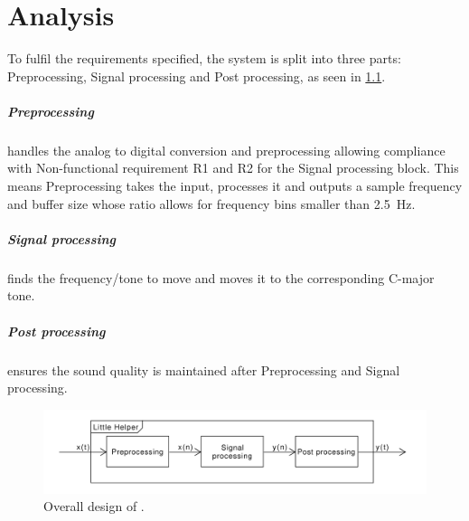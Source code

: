 
\chapter{Analysis}

To fulfil the requirements specified, the system is split into three parts: Preprocessing, Signal processing and Post processing, as seen in \cref{fig:overalldesign}.

\paragraph{Preprocessing} handles the analog to digital conversion and preprocessing allowing compliance with Non-functional requirement R1 and R2 for the Signal processing block.
This means Preprocessing takes the input, processes it and outputs a sample frequency and buffer size whose ratio allows for frequency bins smaller than \SI{2.5}{\hertz}.

\paragraph{Signal processing} finds the frequency/tone to move and moves it to the corresponding C-major tone.

\paragraph{Post processing} ensures the sound quality is maintained after Preprocessing and Signal processing.

\begin{figure}
	\centering
	\includegraphics[width=1\linewidth]{gfx/Design/OverallDesign.pdf}
	\caption{Overall design of \systemName.}
	\label{fig:overalldesign}
\end{figure}

